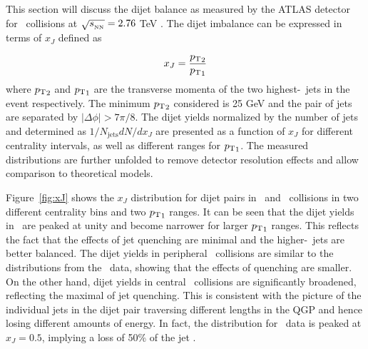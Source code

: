
This section will discuss the dijet balance as measured by the ATLAS detector for \pbpb\ collisions at $\mbox{$\sqrt{s_{_\text{NN}}}$} = 2.76$ TeV \cite{Aaboud:2017eww}.
The dijet imbalance can be expressed in terms of $x_J$ defined as

\begin{align}
x_J =  \frac{\mbox{$p_{\mathrm{T}}$}_2}{\mbox{$p_{\mathrm{T}}$}_1}
\end{align}
where $\mbox{$p_{\mathrm{T}}$}_2$ and $\mbox{$p_{\mathrm{T}}$}_1$ are the transverse momenta of the two highest-\pt\ jets in the event respectively.
The minimum $\mbox{$p_{\mathrm{T}}$}_2$ considered is 25 GeV and the pair of jets are separated by $|\Delta\phi| > 7\pi/8$.
The dijet yields normalized by the number of jets and determined as $1/N_\mathrm{jets} dN/dx_J$ are presented as a function of $x_J$ for different centrality intervals, as well as different ranges for $\mbox{$p_{\mathrm{T}}$}_1$.
The measured distributions are further unfolded to remove detector resolution effects and allow comparison to theoretical models.

Figure~\ref{fig:xJ} shows the $x_J$ distribution for dijet pairs in \pp\ and \pbpb\ collisions in two different centrality bins and two $\mbox{$p_{\mathrm{T}}$}_1$ ranges.
It can be seen that the dijet yields in \pp\ are peaked at unity and become narrower for larger $\mbox{$p_{\mathrm{T}}$}_1$ ranges.
This reflects the fact that the effects of jet quenching are minimal and the higher-\pt\ jets are better balanced.
The dijet yields in peripheral \pbpb\ collisions are similar to the distributions from the \pp\ data, showing that the effects of quenching are smaller.
On the other hand, dijet yields in central \pbpb\ collisions are significantly broadened, reflecting the maximal  of jet quenching.
This is consistent with the picture of the individual jets in the dijet pair traversing different lengths in the QGP and hence losing different amounts of energy.
In fact, the distribution for \pbpb\ data is peaked at $x_J = 0.5$, implying a loss of 50\% of the jet \pt.

